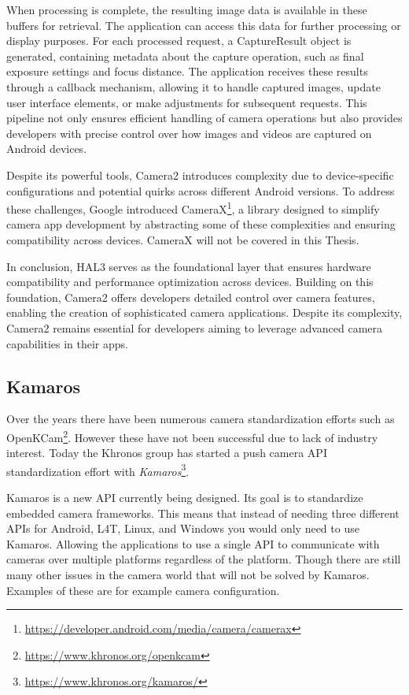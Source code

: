 When processing is complete, the resulting image data is available in these
buffers for retrieval. The application can access this data for further
processing or display purposes. For each processed request, a CaptureResult
object is generated, containing metadata about the capture operation, such as
final exposure settings and focus distance. The application receives these
results through a callback mechanism, allowing it to handle captured images,
update user interface elements, or make adjustments for subsequent requests.
This pipeline not only ensures efficient handling of camera operations but also
provides developers with precise control over how images and videos are
captured on Android devices.


Despite its powerful tools, Camera2 introduces complexity due to
device-specific configurations and potential quirks across different Android
versions. To address these challenges, Google introduced CameraX\footnote{\url{https://developer.android.com/media/camera/camerax}},
a library designed to simplify camera app development by abstracting some of
these complexities and ensuring compatibility across devices. CameraX will not
be covered in this Thesis.

In conclusion, HAL3 serves as the foundational layer that ensures hardware
compatibility and performance optimization across devices. Building on this
foundation, Camera2 offers developers detailed control over camera features,
enabling the creation of sophisticated camera applications. Despite its
complexity, Camera2 remains essential for developers aiming to leverage
advanced camera capabilities in their apps.


\subsection{Kamaros}
Over the years there have been numerous camera standardization efforts such as
OpenKCam\footnote{\url{https://www.khronos.org/openkcam}}. However these have not been
successful due to lack of industry interest. Today the Khronos group has
started a push camera API standardization effort with \textit{Kamaros}\footnote{\url{https://www.khronos.org/kamaros/}}.

Kamaros is a new API currently being designed. Its goal is to
standardize embedded camera frameworks. This means that instead of needing
three different APIs for Android, L4T, Linux, and Windows you would only need to
use Kamaros. Allowing the applications to use a single API to communicate with
cameras over multiple platforms regardless of the platform. Though there are
still many other issues in the camera world that will not be solved by Kamaros.
Examples of these are for example camera configuration.

